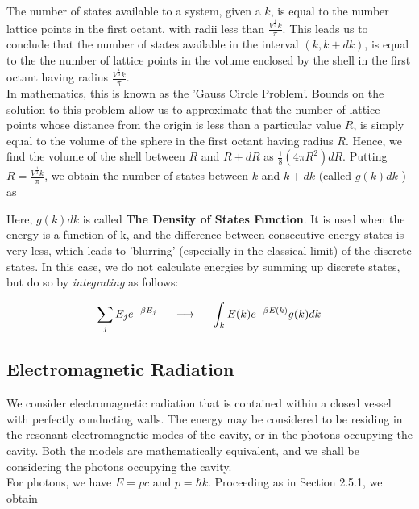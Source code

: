\documentclass[oneside]{book}
\begin{document}
The number of states available to a system, given a $k$, is equal to the number lattice points in the first octant, with radii less than 
$\frac{V^{\frac{1}{3}} k }{\pi} $. This leads us to conclude that the number of states available in the interval $(k, k + dk)$, is equal to the the number of lattice points in the volume enclosed by the shell in the first octant having radius $\frac{V^{\frac{1}{3}} k }{\pi} $.\\

In mathematics, this is known as the 'Gauss Circle Problem'. Bounds on the solution to this problem allow us to approximate that the number of lattice points whose distance from the origin is less than a particular value $R$, is simply equal to the volume of the sphere in the first octant having radius $R$. Hence, we find the volume of the shell between $R$ and $R + dR$ as $\frac{1}{8}(4\pi R^2)dR$. Putting $R = \frac{V^{\frac{1}{3}} k }{\pi} $, we obtain the number of states between $k$ and $k+dk$  (called $g(k)dk$ ) as

\begin{center}
\end{center}

Here, $g(k)dk$ is called \textbf{The Density of States Function}. It is used when the energy is a function of k, and the difference between consecutive energy states is very less, which leads to 'blurring' (especially in the classical limit) of the discrete states. In this case, we do not calculate energies by summing up discrete states, but do so by \emph{integrating} as follows:

\[  \sum_{j}^{}E_je^{-\beta E_j} \hspace{0.5cm} \longrightarrow \hspace{0.5cm} \int_{k}^{} E(k)e^{-\beta E(k)} g(k)dk \]

\subsection{Electromagnetic Radiation}
We consider electromagnetic radiation that is contained within a closed vessel with perfectly conducting walls. The energy may be considered to be residing in the resonant electromagnetic modes of the cavity, or in the photons occupying the cavity. Both the models are mathematically equivalent, and we shall be considering the photons occupying the cavity.\\

For photons, we have $E = pc$ and $p = \hbar k$. Proceeding as in Section 2.5.1, we obtain 
\end{document}
